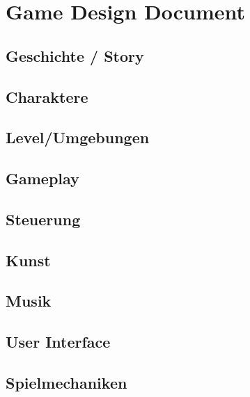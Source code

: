 \section{Game Design Document}
\label{ganmeDesignDoku}
\subsection{Geschichte / Story}

\subsection{Charaktere}
\subsection{Level/Umgebungen}
\subsection{Gameplay}
\subsection{Steuerung}
\subsection{Kunst}
\subsection{Musik}
\subsection{User Interface}
\subsection{Spielmechaniken}

\newpage